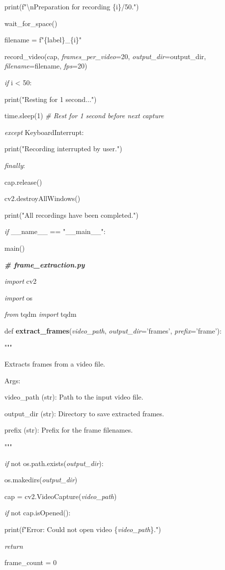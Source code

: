\documentclass[
]{article}
\begin{document}
print(f"\textbackslash nPreparation for recording \{i\}/50.")

wait\_for\_space()

filename = f"\{label\}\_\{i\}"

record\_video(cap, \emph{frames\_per\_video}=20, \emph{output\_dir}=output\_dir, \emph{filename}=filename, \emph{fps}=20)

\emph{if} i \textless{} 50:

print("Resting for 1 second...")

time.sleep(1) \emph{\# Rest for 1 second before next capture}

\emph{except} KeyboardInterrupt:

print("Recording interrupted by user.")

\emph{finally}:

cap.release()

cv2.destroyAllWindows()

print("All recordings have been completed.")

\emph{if} \_\_name\_\_ == "\_\_main\_\_":

main()

\emph{\textbf{\# frame\_extraction.py}}

\emph{import} cv2

\emph{import} os

\emph{from} tqdm \emph{import} tqdm

def \textbf{extract\_frames}(\emph{video\_path}, \emph{output\_dir}='frames', \emph{prefix}='frame'):

"""

Extracts frames from a video file.

Args:

video\_path (str): Path to the input video file.

output\_dir (str): Directory to save extracted frames.

prefix (str): Prefix for the frame filenames.

"""

\emph{if} not os.path.exists(\emph{output\_dir}):

os.makedirs(\emph{output\_dir})

cap = cv2.VideoCapture(\emph{video\_path})

\emph{if} not cap.isOpened():

print(f"Error: Could not open video \{\emph{video\_path}\}.")

\emph{return}

frame\_count = 0
\end{document}
